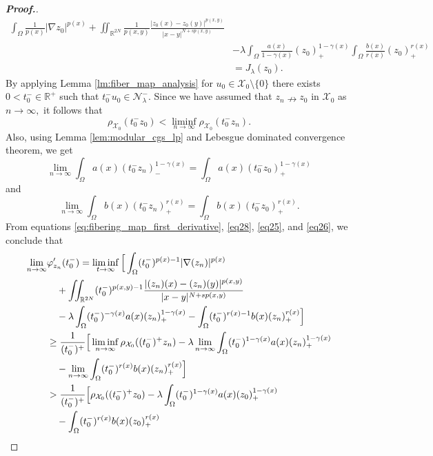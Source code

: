 \documentclass[11pt]{article}
\newcommand{\X}{\mathcal{X}_{0}}
\newcommand{\Nh}{\mathcal{N}_\la}
\newcommand{\rh}{\rho_{\X}}
\newcommand{\lmt}{\lim_{n\to\infty}}
\newcommand{\ga} {\gamma}
\newcommand{\om} {\Omega}
\newcommand{\la} {\lambda}
\newcommand{\real}{\mathbb{R}}
\newcommand{\grad}{\nabla}
\begin{document}
\begin{proof}[\bf Proof.]
\begin{align}
\int_\om 
\frac{1}{p(x)} |\grad z_0|^{p(x)}
+\iint_{\mathbb{R}^{2N}}
\frac{1}{p(x,y)}
\frac{|z_0(x)-z_0(y)|^{p(x,y)}}
{|x-y|^{N+sp(x,y)}}\nonumber\\
                &-\la
\int_\om 
\frac{a(x)}{1-\ga(x)}(z_0)_+^{1-\ga(x)}    
\int_\om 
\frac{b(x)}{r(x)}(z_0)_+^{r(x)}\nonumber\\
   &     =J_\la(z_0).
    \end{align}
    By applying Lemma 
    \ref{lm:fiber_map_analysis} for 
    $u_0\in \X\setminus\{0\}$
there exists $0<t_0^-\in \real^+$
such that $t_0^-u_0\in\Nh^-.$
Since we have assumed that 
$z_n\nrightarrow z_0$
in $\X$
as $n\to\infty,$
it follows that
\begin{equation}\label{eq28}
    \rh(t_0^-z_0)< \liminf_{n\to\infty} 
    \rh(t_0^-z_n).
\end{equation}
Also, using Lemma \ref{lem:modular_cgs_lp} 
and Lebesgue dominated convergence theorem, 
we get
\begin{equation}\label{eq25}
    \lim_{n\to\infty}
\int_\om a(x)(t_0^-z_n)_-^{1-\ga(x)}=
\int_\om a(x)(t_0^-z_0)_+^{1-\ga(x)}
  \end{equation}
and 
\begin{equation}\label{eq26}
    \lim_{n\to\infty}
\int_\om b(x)(t_0^-z_n)_+^{r(x)}=
\int_\om b(x)(t_0^-z_0)_+^{r(x)}.
  \end{equation}
From equations 
\eqref{eq:fibering_map_first_derivative}, 
\eqref{eq28}, \eqref{eq25}, and \eqref{eq26}, 
we conclude that
    \begin{align}\label{eq27}
        \lmt 
        & \varphi'_{z_n}(t_0^-)
  =\liminf_{t\to\infty}\Big [
\int_\om (t_0^-)^{p(x)-1}|\grad (z_n)|^{p(x)}
 \notag \\
 & \quad 
 +\iint_{\mathbb{R}^{2N}} (t_0^-)^{p(x,y)-1}
\frac{|(z_n)(x)-(z_n)(y)|^{p(x,y)}}
{|x-y|^{N+sp(x,y)}}  \nonumber\\
        &\quad -\la
\int_\om (t_0^-)^{-\ga(x)}a(x)(z_n)_+^{1-\ga(x)}
        -
\int_\om (t_0^-)^{r(x)-1}b(x)(z_n)_+^{r(x)}
\Big ]\nonumber\\
       & \ge
\frac{1}{(t_0^-)^+}
\Big  [\liminf_{n\to\infty}\rh((t_0^-)^+z_n)-\la\lmt
\int_\om (t_0^-)^{1-\ga(x)}a(x)(z_n)_+^{1-\ga(x)}
 \nonumber\\
        &\quad -\lmt
\int_\om (t_0^-)^{r(x)}b(x)(z_n)_+^{r(x)}
\Big ]\nonumber\\
        & >
\frac{1}{(t_0^-)^+}\Big [\rh((t_0^-)^+z_0) -\la
\int_\om (t_0^-)^{1-\ga(x)}a(x)(z_0)_+^{1-\ga(x)} \notag \\
 & \quad -
\int_\om (t_0^-)^{r(x)}b(x)(z_0)_+^{r(x)}

\end{align}
\end{proof}
\end{document}

